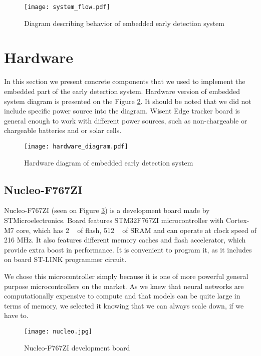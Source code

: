 \begin{figure}[ht]
        \centering
        \texttt{[image: system\_flow.pdf]} 
        \caption{ Diagram describing behavior of embedded early detection system} 
        \label{system_flow}
\end{figure}


\section{ Hardware}

In this section we present concrete components that we used to implement the embedded part of the early detection system.
Hardware version of embedded system diagram is presented on the Figure \ref{hardware_diagram}.
It should be noted that we did not include specific power source into the diagram.
Wisent Edge tracker board is general enough to work with different power sources, such as non-chargeable or chargeable batteries and or solar cells.

\begin{figure}[ht]
        \centering
        \texttt{[image: hardware\_diagram.pdf]} 
        \caption{ Hardware diagram of embedded early detection system} 
        \label{hardware_diagram}
\end{figure}

\subsection{ Nucleo-F767ZI}

Nucleo-F767ZI (seen on Figure \ref{nucleo}) is a development board made by STMicroelectronics.
Board features STM32F767ZI microcontroller with Cortex-M7 core, which has 2 \si{\mega\byte} of flash, 512 \si{\kilo\byte} of SRAM and can operate at clock speed of 216 \si{\mega\hertz}.
It also features different memory caches and flash accelerator, which provide extra boost in performance.
It is convenient to program it, as it includes on board ST-LINK programmer circuit.

We chose this microcontroller simply because it is one of more powerful general purpose microcontrollers on the market.
As we knew that neural networks are computationally expensive to compute and that models can be quite large in terms of memory, we selected it knowing that we can always scale down, if we have to.

\begin{figure}[ht]
        \centering
        \texttt{[image: nucleo.jpg]} 
        \caption{ Nucleo-F767ZI development board} 
        \label{nucleo}
\end{figure}


